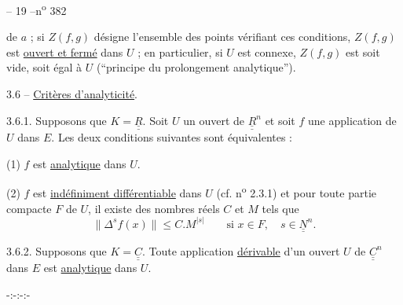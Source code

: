 \begin{center}-- 19 --\hfill n\textsuperscript{o} 382\end{center}
de $a$ ; si $Z(f,g)$ désigne l'ensemble des points vérifiant ces conditions, $Z(f,g)$ est \uline{ouvert et fermé} dans $U$ ; en particulier, si $U$ est connexe, $Z(f,g)$ est soit vide, soit égal à $U$ (``principe du prolongement analytique'').

3.6 -- \uline{Critères d'analyticité}.

3.6.1. Supposons que $K=\underline{\underline{R}}$. Soit $U$ un ouvert de $\underline{\underline{R}}^n$ et soit $f$ une application de $U$ dans $E$. Les deux conditions suivantes sont équivalentes :

(1) $f$ est \uline{analytique} dans $U$.

(2) $f$ est \uline{indéfiniment différentiable} dans $U$ (cf. n\textsuperscript{o} 2.3.1) et pour toute partie compacte $F$ de $U$, il existe des nombres réels $C$ et $M$ tels que
\[
\lVert\Delta^s f(x)\rVert\leq C.M^{|s|}\qquad\text{si }x\in F,\quad s\in\underline{\underline{N}}^n.
\]

3.6.2. Supposons que $K=\underline{\underline{C}}$. Toute application \uline{dérivable} d'un ouvert $U$ de $\underline{\underline{C}}^n$ dans $E$ est \uline{analytique} dans $U$.

\begin{center}-:-:-:-\end{center}
